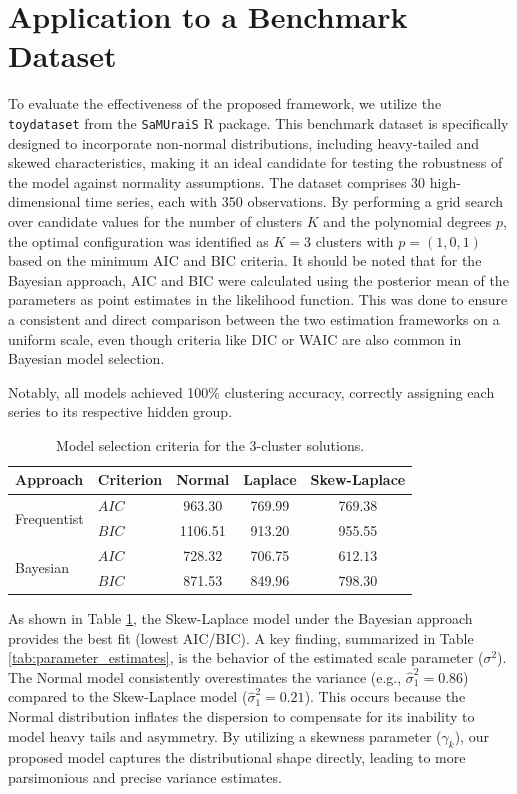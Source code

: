 \documentclass[twoside]{article}
\begin{document}
\section{Application to a Benchmark Dataset}
To evaluate the effectiveness of the proposed framework, we utilize the \texttt{toydataset} from the \texttt{SaMUraiS} R package. This benchmark dataset is specifically designed to incorporate non-normal distributions, including heavy-tailed and skewed characteristics, making it an ideal candidate for testing the robustness of the model against normality assumptions. The dataset comprises 30 high-dimensional time series, each with 350 observations. By performing a grid search over candidate values for the number of clusters $K$ and the polynomial degrees $p$, the optimal configuration was identified as $K=3$ clusters with $p = (1, 0, 1)$ based on the minimum AIC and BIC criteria. It should be noted that for the Bayesian approach, AIC and BIC were calculated using the posterior mean of the parameters as point estimates in the likelihood function. This was done to ensure a consistent and direct comparison between the two estimation frameworks on a uniform scale, even though criteria like DIC or WAIC are also common in Bayesian model selection.

Notably, all models achieved 100\% clustering accuracy, correctly assigning each series to its respective hidden group.

\begin{table}[ht]
\centering
\caption{Model selection criteria for the 3-cluster solutions.}
\label{tab:model_selection}
\footnotesize
\begin{tabular}{llccc}
\hline
Approach & Criterion & Normal & Laplace & Skew-Laplace \\
\hline
\multirow{2}{*}{Frequentist} & $AIC$ & 963.30 & 769.99 & 769.38 \\
 & $BIC$ & 1106.51 & 913.20 & 955.55 \\
\hline
\multirow{2}{*}{Bayesian} & $AIC$ & 728.32 & 706.75 & $\mathbf{612.13}$ \\
 & $BIC$ & 871.53 & 849.96 & $\mathbf{798.30}$ \\
\hline
\end{tabular}
\end{table}

As shown in Table \ref{tab:model_selection}, the Skew-Laplace model under the Bayesian approach provides the best fit (lowest AIC/BIC). A key finding, summarized in Table \ref{tab:parameter_estimates}, is the behavior of the estimated scale parameter ($\sigma^2$). The Normal model consistently overestimates the variance (e.g., $\hat{\sigma}_1^2 = 0.86$) compared to the Skew-Laplace model ($\hat{\sigma}_1^2 = 0.21$). This occurs because the Normal distribution inflates the dispersion to compensate for its inability to model heavy tails and asymmetry. By utilizing a skewness parameter ($\gamma_k$), our proposed model captures the distributional shape directly, leading to more parsimonious and precise variance estimates.
\end{document}

